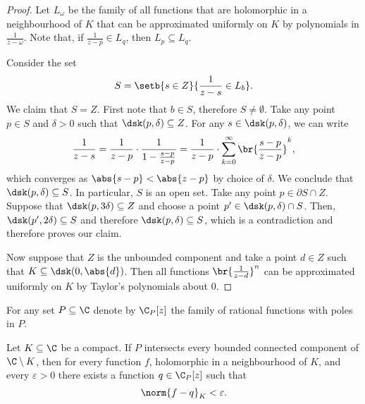 \begin{proof}
Let $L_\omega$ be the family of all functions that are holomorphic
in a neighbourhood of $K$ that can be approximated uniformly on $K$
by polynomials in $\frac{1}{z-\omega}$. Note that, if
$\frac{1}{z-p} \in L_q$, then $L_p \subseteq L_q$.

Consider the set
\[
S = \setb{s \in Z}{\frac{1}{z-s} \in L_b}.
\]
We claim that $S = Z$. First note that $b \in S$, therefore
$S \ne \emptyset$. Take any point $p \in S$ and $\delta > 0$ such
that $\dsk(p, \delta) \subseteq Z$. For any
$s \in \dsk(p, \delta)$, we can write
\[
\frac{1}{z-s} =
\frac{1}{z-p} \cdot \frac{1}{1 - \frac{s-p}{z-p}} =
\frac{1}{z-p} \cdot \sum_{k=0}^\infty
\br{\frac{s-p}{z-p}}^k,
\]
which converges as $\abs{s-p} < \abs{z-p}$ by choice of $\delta$.
We conclude that $\dsk(p, \delta) \subseteq S$. In particular, $S$
is an open set. Take any point $p \in \partial S \cap Z$. Suppose
that $\dsk(p, 3 \delta) \subseteq Z$ and choose a point
$p' \in \dsk(p, \delta) \cap S$. Then,
$\dsk(p', 2\delta) \subseteq S$ and therefore
$\dsk(p, \delta) \subseteq S$, which is a contradiction and
therefore proves our claim.

Now suppose that $Z$ is the unbounded component and take a point
$d \in Z$ such that $K \subseteq \dsk(0, \abs{d})$. Then all
functions $\br{\frac{1}{z-d}}^n$ can be approximated uniformly on
$K$ by Taylor's polynomials about $0$.
\end{proof}

\begin{definicija}
For any set $P \subseteq \C$ denote by $\C_P[z]$ the family of
rational functions with poles in $P$.
\end{definicija}

\begin{izrek}
\label{app:thm:runge_app}
Let $K \subseteq \C$ be a compact. If $P$ intersects every bounded
connected component of $\C \setminus K$, then for every function
$f$, holomorphic in a neighbourhood of $K$, and every
$\varepsilon > 0$ there exists a function $q \in \C_P[z]$ such that
\[
\norm{f-q}_K < \varepsilon.
\]
\end{izrek}

